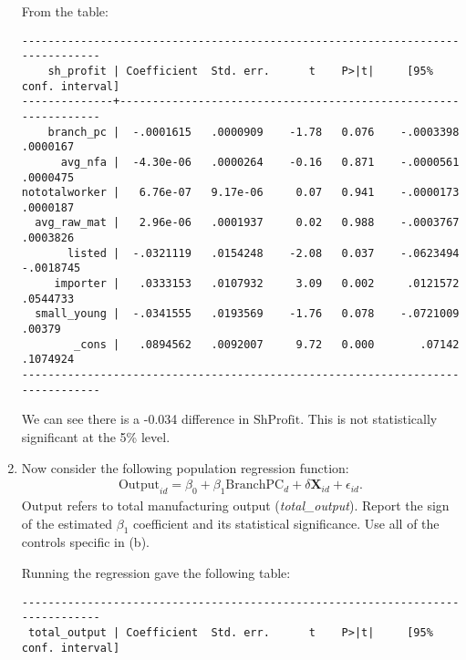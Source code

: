 \documentclass[11pt,twoside,openany]{memoir}
\begin{document}
\begin{question}
\begin{enumerate}[label = (\alph*),itemsep=1pt,topsep=3pt]
            {\color{blue} \begin{solution}
                From the table:
                \begin{Verbatim}[fontsize=\footnotesize]
-------------------------------------------------------------------------------
    sh_profit | Coefficient  Std. err.      t    P>|t|     [95% conf. interval]
--------------+----------------------------------------------------------------
    branch_pc |  -.0001615   .0000909    -1.78   0.076    -.0003398    .0000167
      avg_nfa |  -4.30e-06   .0000264    -0.16   0.871    -.0000561    .0000475
nototalworker |   6.76e-07   9.17e-06     0.07   0.941    -.0000173    .0000187
  avg_raw_mat |   2.96e-06   .0001937     0.02   0.988    -.0003767    .0003826
       listed |  -.0321119   .0154248    -2.08   0.037    -.0623494   -.0018745
     importer |   .0333153   .0107932     3.09   0.002     .0121572    .0544733
  small_young |  -.0341555   .0193569    -1.76   0.078    -.0721009      .00379
        _cons |   .0894562   .0092007     9.72   0.000       .07142    .1074924
-------------------------------------------------------------------------------
                \end{Verbatim}
                We can see there is a -0.034 difference in $\text{ShProfit}$. This is not statistically significant at the 5\% level.
            \end{solution}}
        \item Now consider the following population regression function:
            \begin{equation*}
            \begin{split}
                \text{Output}_{id} = \beta_0 + \beta_1\text{BranchPC}_d + \delta \mathbf{X}_{id} + \epsilon_{id}.
            \end{split}
            \end{equation*}
        $\text{Output}$ refers to total manufacturing output (\textit{total\_output}). Report the sign of the estimated $\beta_1$ coefficient and its statistical significance. Use all of the controls specific in (b).
            {\color{blue} \begin{solution}
                Running the regression gave the following table:
                \begin{Verbatim}[fontsize=\footnotesize]
-------------------------------------------------------------------------------
 total_output | Coefficient  Std. err.      t    P>|t|     [95% conf. interval]

\end{Verbatim}
\end{solution}}
\end{enumerate}
\end{question}
\end{document}

